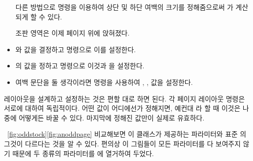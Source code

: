 \begin{itemize}
다른 방법으로 \cmd{\setulmarginsandblock} 명령을 이용하여 상단 및 하단
여백의 크기를 정해줌으로써 \lnc{\textheight}가 계산되게 할 수 있다.

조판 영역은 이제 페이지 위에 앉혀졌다.

\item \lnc{\headheight}와 \lnc{\footskip} 값을 결정하고 \cmd{\setheadfoot} 명령으로 이를 설정한다.

\item \cmd{\headskip}의 값을 정하고 \cmd{\setheaderspaces} 명령으로
이것과 \lnc{\headmargin}을 설정한다.

\item 여백 문단을 둘 생각이라면 \cmd{\setmarginnotes} 명령을 사용하여
\lnc{\marginparsep}, \cmd{\marginparwidth}, \cmd{\marginparpush} 값을
설정한다.

\end{itemize}

레이아웃을 설계하고 설정하는 것은 편할 대로 하면 된다. 각 페이지 레이아웃 명령은
서로에 대하여 독립적이다. 어떤 값이 어디에선가 정해지면, 예컨대 \lnc{\textwidth}라 할 때 이것은 나중에 어떻게든 바꿀 수 있다. 
마지막에 정해진 값만이 실제로 유효하다.


\figurerefname~\ref{fig:oddstock}\과 \ref{fig:anoddpage}\를
비교해보면 이 클래스가 제공하는 파라미터와 표준 \ltx 의 그것이
다르다는 것을 알 수 있다.
편의상 이 그림들이 모든 파라미터를 다 보여주지 않기 때문에 두 종류의
파라미터를 에 열거하여 두었다.

